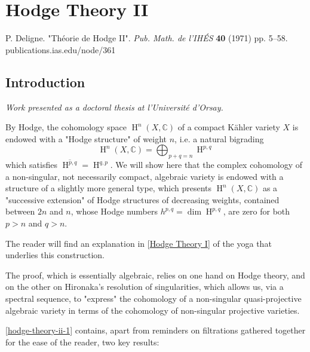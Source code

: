 \part{Hodge Theory II}\label{hodge-theory-ii}\thispagestyle{fancy}\par{}P. Deligne.
  "Théorie de Hodge II".
  \emph{Pub. Math. de l'IHÉS} \textbf{40} (1971) pp. 5–58.
  publications.ias.edu/node/361\chapter{Introduction}\thispagestyle{fancy}\label{hodge-theory-ii-introduction}\par{}\emph{Work presented as a doctoral thesis at l'Université d'Orsay.}\par{}By Hodge, the cohomology space \(\operatorname {H}^n(X,\mathbb {C})\) of a compact Kähler variety \(X\) is endowed with a "Hodge structure" of weight \(n\), i.e. a natural bigrading
  \[     \operatorname {H}^n(X,\mathbb {C})     = \bigoplus _{p+q=n} \operatorname {H}^{p,q}   \]
  which satisfies \(\overline {\operatorname {H}^{p,q}}=\operatorname {H}^{q,p}\).
  We will show here that the complex cohomology of a non-singular, not necessarily compact, algebraic variety is endowed with a structure of a slightly more general type, which presents \(\operatorname {H}^n(X,\mathbb {C})\) as a "successive extension" of Hodge structures of decreasing weights, contained between \(2n\) and \(n\), whose Hodge numbers \(h^{p,q}=\dim \operatorname {H}^{p,q}\), are zero for both \(p>n\) and \(q>n\).\par{}The reader will find an explanation in [\hyperref[hodge-theory-i]{Hodge Theory I}] of the yoga that underlies this construction.\par{}The proof, which is essentially algebraic, relies on one hand on Hodge theory, and on the other on Hironaka's resolution of singularities, which allows us, via a spectral sequence, to "express" the cohomology of a non-singular quasi-projective algebraic variety in terms of the cohomology of non-singular projective varieties.\par{}\cref{hodge-theory-ii-1} contains, apart from reminders on filtrations gathered together for the ease of the reader, two key results:

